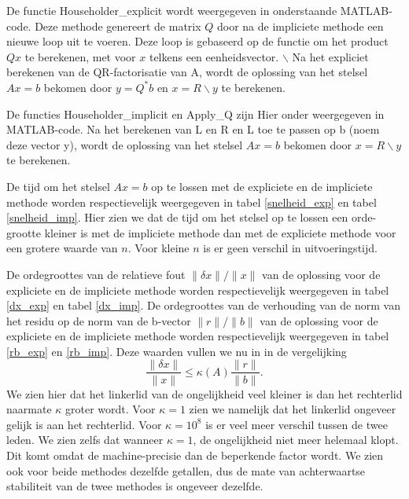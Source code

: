 De functie Householder\_explicit wordt weergegeven in onderstaande MATLAB-code. Deze methode genereert de matrix $Q$ door na de impliciete methode een nieuwe loop uit te voeren. Deze loop is gebaseerd op de functie om het product $Qx$ te berekenen, met voor $x$ telkens een eenheidsvector.
$\backslash$
Na het expliciet berekenen van de QR-factorisatie van A, wordt de oplossing van het stelsel $Ax=b$ bekomen door $y = Q^*b$ en $x= R\backslash y$ te berekenen.



De functies Householder\_implicit en Apply\_Q zijn Hier onder weergegeven in MATLAB-code.
Na het berekenen van L en R en L toe te passen op b (noem deze vector y), wordt de oplossing van het stelsel $Ax=b$ bekomen door $x= R\backslash y$ te berekenen. 





De tijd om het stelsel $Ax=b$ op te lossen met de expliciete en de impliciete methode worden respectievelijk weergegeven in tabel \ref{snelheid_exp} en tabel \ref{snelheid_imp}. Hier zien we dat de tijd om het stelsel op te lossen een orde-grootte kleiner is met de impliciete methode dan met de expliciete methode voor een grotere waarde van $n$. Voor kleine $n$ is er geen verschil in uitvoeringstijd.

De ordegroottes van de relatieve fout $\lVert \delta x \rVert/\lVert x \rVert$ van de oplossing voor de expliciete en de impliciete methode worden respectievelijk weergegeven in tabel \ref{dx_exp} en tabel \ref{dx_imp}.
De ordegroottes van de verhouding van de norm van het residu op de norm van de b-vector $\lVert r \rVert/\lVert b \rVert$ van de oplossing voor de expliciete en de impliciete methode worden respectievelijk weergegeven in tabel \ref{rb_exp} en \ref{rb_imp}. Deze waarden vullen we nu in in de vergelijking
$$ \frac{\lVert \delta x \rVert}{\lVert x \rVert} \leq \kappa(A) \frac{\lVert r \rVert}{\lVert b \rVert}.$$
We zien hier dat het linkerlid van de ongelijkheid veel kleiner is dan het rechterlid naarmate $\kappa$ groter wordt. Voor $\kappa = 1$ zien we namelijk dat het linkerlid ongeveer gelijk is aan het rechterlid. Voor $\kappa = 10^8$ is er veel meer verschil tussen de twee leden. We zien zelfs dat wanneer $\kappa = 1$, de ongelijkheid niet meer helemaal klopt. Dit komt omdat de machine-precisie dan de beperkende factor wordt. We zien ook voor beide methodes dezelfde getallen, dus de mate van achterwaartse stabiliteit van de twee methodes is ongeveer dezelfde.

